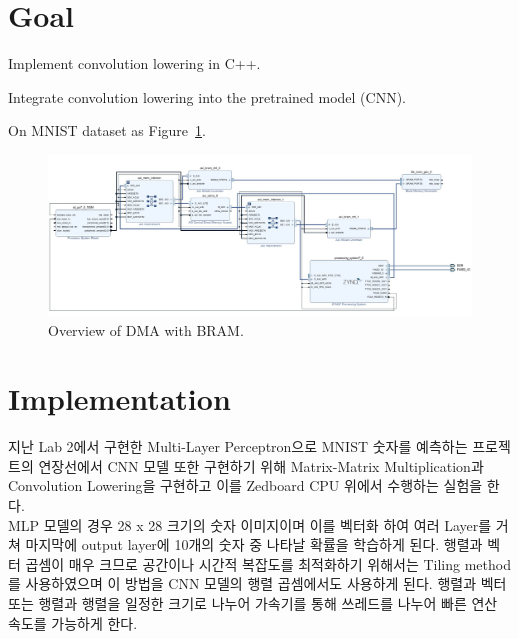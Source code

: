 \documentclass{article}
\begin{document}
\pagestyle{fancy}

\section*{Goal}

\begin{itemize*}
\item Implement convolution lowering in C++.
\item Integrate convolution lowering into the pretrained model (CNN).
\begin{itemize*}
\item On MNIST dataset as Figure~\ref{fig1}.
\end{itemize*}
\end{itemize*}
\begin{figure}[ht]
	\centering
	\includegraphics[width=1\textwidth]{fig/overview.jpg}
\caption{Overview of DMA with BRAM.}
\label{fig1}
\end{figure}

\section{Implementation}
지난 Lab 2에서 구현한 Multi-Layer Perceptron으로 MNIST 숫자를 예측하는 프로젝트의 연장선에서 CNN 모델 또한 구현하기 위해 Matrix-Matrix Multiplication과 Convolution Lowering을 구현하고 이를 Zedboard CPU 위에서 수행하는 실험을 한다. \\

MLP 모델의 경우 28 x 28 크기의 숫자 이미지이며 이를 벡터화 하여 여러 Layer를 거쳐 마지막에 output layer에 10개의 숫자 중 나타날 확률을 학습하게 된다. 행렬과 벡터 곱셈이 매우 크므로 공간이나 시간적 복잡도를 최적화하기 위해서는 Tiling method를 사용하였으며 이 방법을 CNN 모델의 행렬 곱셈에서도 사용하게 된다. 행렬과 벡터 또는 행렬과 행렬을 일정한 크기로 나누어 가속기를 통해 쓰레드를 나누어 빠른 연산 속도를 가능하게 한다. \\
\end{document}
